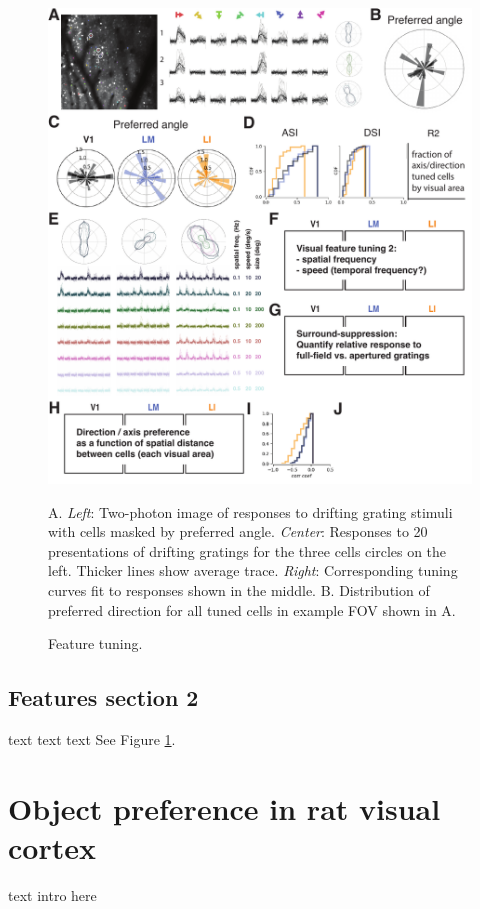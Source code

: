 \documentclass{article}
\begin{document}
\begin{figure}[ht]
  \includegraphics[width=\textwidth]{figures/features.pdf}
  \caption{Feature tuning.}
  \medskip
  \small
  A.  \textit{Left}:  Two-photon image of responses to drifting grating stimuli with cells masked by preferred angle. \textit{Center}:  Responses to 20 presentations of drifting gratings for the three cells circles on the left. Thicker lines show average trace. \textit{Right}:  Corresponding tuning curves fit to responses shown in the middle. 
  B.  Distribution of preferred direction for all tuned cells in example FOV shown in A.
  
  \label{fig:fig3}
\end{figure}

\subsection{Features section 2}
text text text
See Figure \ref{fig:fig3}.


\section{Object preference in rat visual cortex}
text intro here
\end{document}
